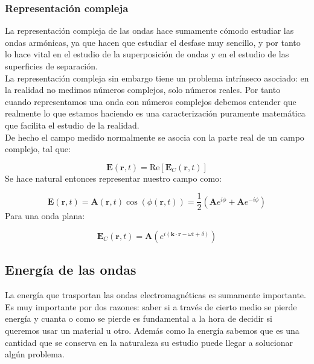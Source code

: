 \documentclass[12pt,a4paper]{article}
\newcommand{\parentesis}[1]{\left( #1  \right)}
\newcommand{\Real}{\mathrm{Re}}
\newcommand{\En}{\mathbf{E}}
\newcommand{\kn}{\mathbf{k}}
\newcommand{\rn}{\mathbf{r}}
\newcommand{\An}{\mathbf{A}}
\numberwithin{equation}{section}
\numberwithin{figure}{section}
\begin{document}
\subsubsection{Representación compleja}

La representación compleja de las ondas hace sumamente cómodo estudiar las ondas armónicas, ya que hacen que estudiar el desfase muy sencillo, y por tanto lo hace vital en el estudio de la superposición de ondas y en el estudio de las superficies de separación. \\

La representación compleja sin embargo tiene un problema intrínseco asociado: en la realidad no medimos números complejos, solo números reales. Por tanto cuando representamos una onda con números complejos debemos entender que realmente lo que estamos haciendo es una caracterización puramente matemática que facilita el estudio de la realidad. \\

De hecho el campo medido normalmente se asocia con la parte real de un campo complejo, tal que:

\begin{equation}
\En (\rn,t) = \Real [\En_C (\rn,t) ]
\end{equation}
Se hace natural entonces representar nuestro campo como:

\begin{equation}
\En (\rn,t) = \An (\rn,t) \cos (\phi(\rn,t)) = \dfrac{1}{2} \parentesis{\An e^{i \phi} + \An e^{- i \phi}}
\end{equation}
Para una onda plana:

\begin{equation}
\En_C (\rn,t) =  \An \parentesis{e^{i ( \kn \cdot \rn - \omega t + \delta)}}
\end{equation}

\subsection{Energía de las ondas}

La energía que trasportan las ondas electromagnéticas es sumamente importante. Es muy importante por dos razones: saber si a través de cierto medio se pierde energía y cuanta o como se pierde es fundamental a la hora de decidir si queremos usar un material u otro. Además como la energía sabemos que es una cantidad que se conserva en la naturaleza su estudio puede llegar a solucionar algún problema. \\
\end{document}
